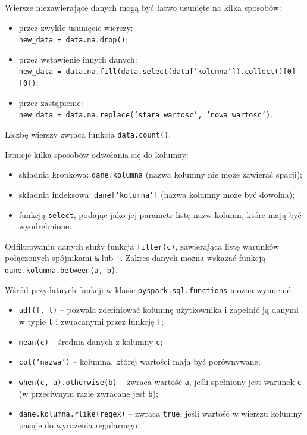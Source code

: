 \documentclass[11pt]{report}
\begin{document}
Wiersze niezawierające danych mogą być łatwo usunięte na kilka sposobów:

\begin{itemize}
    \item przez zwykłe usunięcie wierszy:\\ \texttt{new\_data = data.na.drop()};
    \item przez wstawienie innych danych:\\ \texttt{new\_data = data.na.fill(data.select(data['kolumna']).collect()[0][0])};
    \item przez zastąpienie:\\ \texttt{new\_data = data.na.replace('stara wartosc', 'nowa wartosc')}.
\end{itemize}

Liczbę wierszy zwraca funkcja \texttt{data.count()}.

Istnieje kilka sposobów odwołania się do kolumny:

\begin{itemize}
    \item składnia kropkowa: \texttt{dane.kolumna} (nazwa kolumny nie może zawierać spacji);
    \item składnia indeksowa: \texttt{dane['kolumna']} (nazwa kolumny może być dowolna);
    \item funkcją \texttt{select}, podając jako jej parametr listę nazw kolumn, które mają być wyodrębnione.
\end{itemize}

Odfiltrowaniu danych służy funkcja \texttt{filter(c)}, zawierająca listę warunków połączonych spójnikami \verb|&| lub \verb-|-. Zakres danych można wskazać funkcją \texttt{dane.kolumna.between(a, b)}.

Wśród przydatnych funkcji w klasie \texttt{pyspark.sql.functions} można wymienić:

\begin{itemize}
    \item \texttt{udf(f, t)} -- pozwala zdefiniować kolumnę użytkownika i zapełnić ją danymi w typie \texttt{t} i zwracanymi przez funkcję \texttt{f};
    \item \texttt{mean(c)} -- średnia danych z kolumny \texttt{c};
    \item \texttt{col('nazwa')} -- kolumna, której wartości mają być porównywane;
    \item \texttt{when(c, a).otherwise(b)} -- zwraca wartość \texttt{a}, jeśli spełniony jest warunek \texttt{c} (w przeciwnym razie zwracane jest \texttt{b});
    \item \texttt{dane.kolumna.rlike(regex)} -- zwraca \texttt{true}, jeśli wartość w wierszu kolumny pasuje do wyrażenia regularnego.
\end{itemize}
\end{document}

